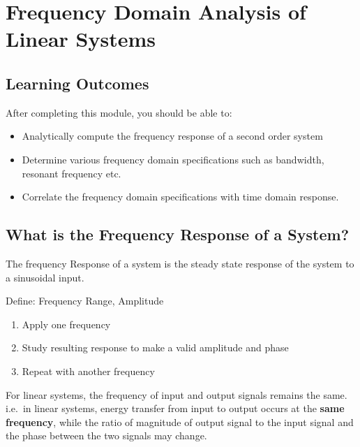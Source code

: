 \documentclass[
  14pt,
  a4paper,
  oneside,
  open=any,
  a4paper,
  14pt]{report}
\begin{document}
\chapter{Frequency Domain Analysis of Linear
Systems}\label{frequency-domain-analysis-of-linear-systems}

\section*{Learning Outcomes}\label{learning-outcomes-7}


After completing this module, you should be able to:

\begin{itemize}
\item
  Analytically compute the frequency response of a second order system
\item
  Determine various frequency domain specifications such as bandwidth,
  resonant frequency etc.
\item
  Correlate the frequency domain specifications with time domain
  response.
\end{itemize}

\section{What is the Frequency Response of a
System?}\label{what-is-the-frequency-response-of-a-system}

The frequency Response of a system is the steady state response of the
system to a sinusoidal input.

Define: Frequency Range, Amplitude

\begin{enumerate}
\def\labelenumi{\arabic{enumi}.}
\item
  Apply one frequency
\item
  Study resulting response to make a valid amplitude and phase
\item
  Repeat with another frequency
\end{enumerate}

For linear systems, the frequency of input and output signals remains
the same. i.e.~in linear systems, energy transfer from input to output
occurs at the \textbf{same frequency}, while the ratio of magnitude of
output signal to the input signal and the phase between the two signals
may change.
\end{document}
